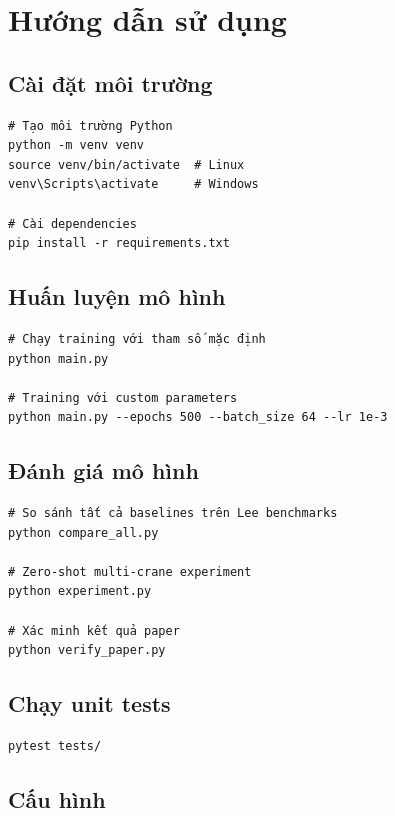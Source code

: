 \documentclass[11pt,a4paper]{article}
\theoremstyle{definition}
\begin{document}
\newpage

\section{Hướng dẫn sử dụng}

\subsection{Cài đặt môi trường}

\begin{lstlisting}[style=python]
# Tạo môi trường Python
python -m venv venv
source venv/bin/activate  # Linux
venv\Scripts\activate     # Windows

# Cài dependencies
pip install -r requirements.txt
\end{lstlisting}

\subsection{Huấn luyện mô hình}

\begin{lstlisting}[style=python]
# Chạy training với tham số mặc định
python main.py

# Training với custom parameters
python main.py --epochs 500 --batch_size 64 --lr 1e-3
\end{lstlisting}

\subsection{Đánh giá mô hình}

\begin{lstlisting}[style=python]
# So sánh tất cả baselines trên Lee benchmarks
python compare_all.py

# Zero-shot multi-crane experiment
python experiment.py

# Xác minh kết quả paper
python verify_paper.py
\end{lstlisting}

\subsection{Chạy unit tests}

\begin{lstlisting}[style=python]
pytest tests/
\end{lstlisting}

\subsection{Cấu hình}
\end{document}
